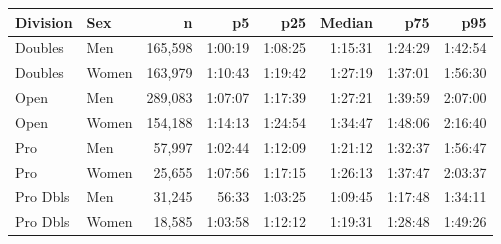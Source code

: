 \begin{tabular}{llrrrrrr}
\toprule
\textbf{Division} & \textbf{Sex} & \multicolumn{1}{r}{\textbf{n}} & \multicolumn{1}{r}{\textbf{p5}} & \multicolumn{1}{r}{\textbf{p25}} & \multicolumn{1}{r}{\textbf{Median}} & \multicolumn{1}{r}{\textbf{p75}} & \multicolumn{1}{r}{\textbf{p95}} \\
\midrule
Doubles & Men & 165,598 & 1:00:19 & 1:08:25 & 1:15:31 & 1:24:29 & 1:42:54 \\
Doubles & Women & 163,979 & 1:10:43 & 1:19:42 & 1:27:19 & 1:37:01 & 1:56:30 \\
Open & Men & 289,083 & 1:07:07 & 1:17:39 & 1:27:21 & 1:39:59 & 2:07:00 \\
Open & Women & 154,188 & 1:14:13 & 1:24:54 & 1:34:47 & 1:48:06 & 2:16:40 \\
Pro & Men & 57,997 & 1:02:44 & 1:12:09 & 1:21:12 & 1:32:37 & 1:56:47 \\
Pro & Women & 25,655 & 1:07:56 & 1:17:15 & 1:26:13 & 1:37:47 & 2:03:37 \\
Pro Dbls & Men & 31,245 & 56:33 & 1:03:25 & 1:09:45 & 1:17:48 & 1:34:11 \\
Pro Dbls & Women & 18,585 & 1:03:58 & 1:12:12 & 1:19:31 & 1:28:48 & 1:49:26 \\
\bottomrule
\end{tabular}